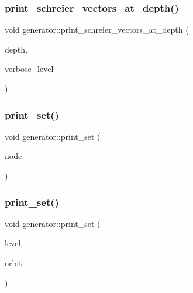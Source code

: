 \mbox{\label{classgenerator_a905ff91771cf86019c8052e7ddcd3287}} 
\subsubsection{\texorpdfstring{print\+\_\+schreier\+\_\+vectors\+\_\+at\+\_\+depth()}{print\_schreier\_vectors\_at\_depth()}}
{\footnotesize\ttfamily void generator\+::print\+\_\+schreier\+\_\+vectors\+\_\+at\+\_\+depth (\begin{DoxyParamCaption}\item[{\mbox{\hyperlink{galois_8h_a09fddde158a3a20bd2dcadb609de11dc}{I\+NT}}}]{depth,  }\item[{\mbox{\hyperlink{galois_8h_a09fddde158a3a20bd2dcadb609de11dc}{I\+NT}}}]{verbose\+\_\+level }\end{DoxyParamCaption})}

\mbox{\label{classgenerator_a6834dd21ab187064c4fb6b8653093605}} 
\subsubsection{\texorpdfstring{print\+\_\+set()}{print\_set()}\hspace{0.1cm}{\footnotesize\ttfamily [1/2]}}
{\footnotesize\ttfamily void generator\+::print\+\_\+set (\begin{DoxyParamCaption}\item[{\mbox{\hyperlink{galois_8h_a09fddde158a3a20bd2dcadb609de11dc}{I\+NT}}}]{node }\end{DoxyParamCaption})}

\mbox{\label{classgenerator_a84b677d1943b20361ef496ae88590bc3}} 
\subsubsection{\texorpdfstring{print\+\_\+set()}{print\_set()}\hspace{0.1cm}{\footnotesize\ttfamily [2/2]}}
{\footnotesize\ttfamily void generator\+::print\+\_\+set (\begin{DoxyParamCaption}\item[{\mbox{\hyperlink{galois_8h_a09fddde158a3a20bd2dcadb609de11dc}{I\+NT}}}]{level,  }\item[{\mbox{\hyperlink{galois_8h_a09fddde158a3a20bd2dcadb609de11dc}{I\+NT}}}]{orbit }\end{DoxyParamCaption})}

